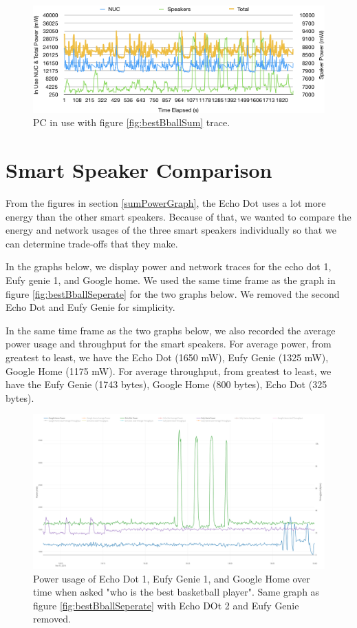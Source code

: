 \begin{figure}[H]
  \centering
  \includegraphics[width=1\textwidth]{figures/nucInUse.png}
  \caption{PC in use with figure \ref{fig:bestBballSum} trace.}
  \label{fig:nucInUse}
\end{figure}

\section{Smart Speaker Comparison}
\label{smartSpeakerComparisonSection}
From the figures in section \ref{sumPowerGraph}, the Echo Dot uses a lot more energy than the other smart speakers. Because of that, we wanted to compare the energy and network usages of the three smart speakers individually so that we can determine trade-offs that they make.

In the graphs below, we display power and network traces for the echo dot 1, Eufy genie 1, and Google home. We used the same time frame as the graph in figure \ref{fig:bestBballSeperate} for the two graphs below. We removed the second Echo Dot and Eufy Genie for simplicity.

In the same time frame as the two graphs below, we also recorded the average power usage and throughput for the smart speakers. For average power, from greatest to least, we have the Echo Dot (1650 mW), Eufy Genie (1325 mW), Google Home (1175 mW). For average throughput, from greatest to least, we have the Eufy Genie (1743 bytes), Google Home (800 bytes), Echo Dot (325 bytes).

\begin{figure}[H]
  \centering
  \includegraphics[width=1\textwidth]{figures/smartSpeakerSeperate.png}
  \caption{Power usage of Echo Dot 1, Eufy Genie 1, and Google Home over time when asked "who is the best basketball player". Same graph as figure \ref{fig:bestBballSeperate} with Echo DOt 2 and Eufy Genie removed.}
  \label{fig:smartSpeakerSeperate}
\end{figure}

